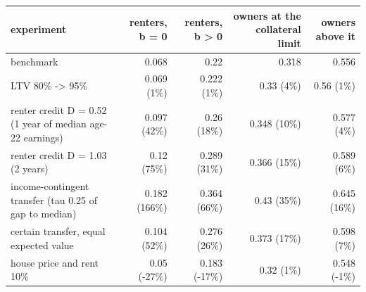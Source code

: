 \begin{tabular}{lrrrr}
\toprule
experiment & renters, b = 0 & renters, b > 0 & owners at the collateral limit & owners above it \\
\midrule
benchmark & 0.068 & 0.22 & 0.318 & 0.556 \\
LTV 80\% -> 95\% & 0.069 (1\%) & 0.222 (1\%) & 0.33 (4\%) & 0.56 (1\%) \\
renter credit D = 0.52 (1 year of median age-22 earnings) & 0.097 (42\%) & 0.26 (18\%) & 0.348 (10\%) & 0.577 (4\%) \\
renter credit D = 1.03 (2 years) & 0.12 (75\%) & 0.289 (31\%) & 0.366 (15\%) & 0.589 (6\%) \\
income-contingent transfer (tau 0.25 of gap to median) & 0.182 (166\%) & 0.364 (66\%) & 0.43 (35\%) & 0.645 (16\%) \\
certain transfer, equal expected value & 0.104 (52\%) & 0.276 (26\%) & 0.373 (17\%) & 0.598 (7\%) \\
house price and rent 10\% & 0.05 (-27\%) & 0.183 (-17\%) & 0.32 (1\%) & 0.548 (-1\%) \\
\bottomrule
\end{tabular}
